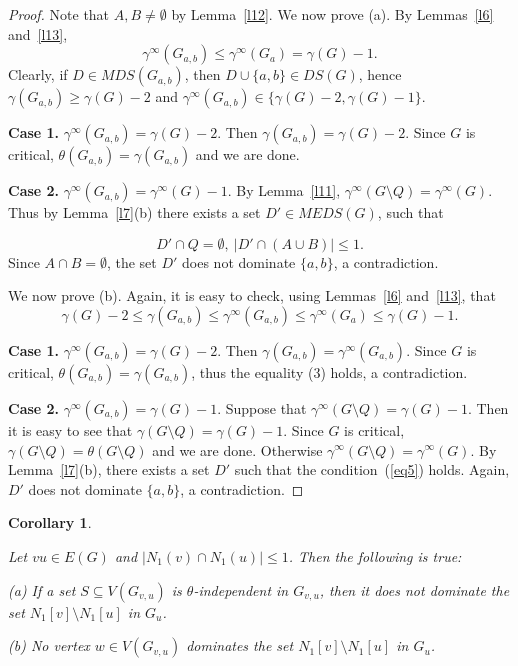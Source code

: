 \documentclass[12pt]{article}
\newtheorem{corollary}{Corollary}
\begin{document}
\begin{proof}
Note that $A,B \neq \emptyset$ by Lemma~\ref{l12}. We now prove (a). By Lemmas~\ref{l6} and~\ref{l13}, $$\gamma^{\infty}(G_{a,b}) \leq \gamma^{\infty}(G_a) = \gamma(G) - 1.$$ 
Clearly, if $D \in MDS(G_{a,b})$, then $D \cup \{a,b\} \in DS(G)$, hence $\gamma(G_{a,b}) \geq \gamma(G) - 2$ and $\gamma^{\infty}(G_{a,b}) \in \{\gamma(G) - 2, \gamma(G) - 1\}$. 

\textbf{Case 1.} $\gamma^{\infty}(G_{a,b}) = \gamma(G) - 2$. Then $\gamma(G_{a,b}) = \gamma(G) - 2$. Since $G$ is critical, $\theta(G_{a,b}) = \gamma(G_{a,b})$ and we are done. 

\textbf{Case 2.} $\gamma^{\infty}(G_{a,b}) = \gamma^{\infty}(G) - 1$. By Lemma~\ref{l11}, $\gamma^{\infty}(G \setminus Q) = \gamma^{\infty}(G)$. Thus by Lemma~\ref{l7}(b) there exists a set $D' \in MEDS(G)$, such that 

\begin{equation}\label{eq5}
D' \cap Q = \emptyset, \ |D' \cap (A \cup B)| \leq 1.
\end{equation}
Since $A \cap B = \emptyset$, the set $D'$ does not dominate $\{a,b\}$, a contradiction.

We now prove (b). Again, it is easy to check, using Lemmas~\ref{l6} and~\ref{l13}, that $$\gamma(G) - 2 \leq \gamma(G_{a,b}) \leq \gamma^{\infty}(G_{a,b}) \leq \gamma^{\infty}(G_a) \leq \gamma(G) - 1.$$

\textbf{Case 1.} $\gamma^{\infty}(G_{a,b}) = \gamma(G) - 2$. Then $\gamma(G_{a,b}) = \gamma^{\infty}(G_{a,b})$. Since $G$ is critical, $\theta(G_{a,b}) = \gamma(G_{a,b})$, thus the equality (3) holds, a contradiction. 

\textbf{Case 2.} $\gamma^{\infty}(G_{a,b}) = \gamma(G) - 1$. Suppose that $\gamma^{\infty}(G \setminus Q) = \gamma(G) - 1$. Then it is easy to see that $\gamma(G \setminus Q) = \gamma(G) - 1$. Since $G$ is critical, $\gamma(G \setminus Q) = \theta(G \setminus Q)$ and we are done. Otherwise $\gamma^{\infty}(G \setminus Q) = \gamma^{\infty}(G)$. By Lemma~\ref{l7}(b), there exists a set $D'$ such that the condition~(\ref{eq5}) holds. Again, $D'$ does not dominate $\{a,b\}$, a contradiction.\end{proof}

\begin{corollary}\label{cor1}

Let $vu \in E(G)$ and $|N_1(v) \cap N_1(u)| \leq 1$. Then the following is true: 

(a) If a set $S \subseteq V(G_{v,u})$ is $\theta$-independent in $G_{v,u}$, then it does not dominate the set $N_1[v] \setminus N_1[u]$ in $G_u$.

(b) No vertex $w \in V(G_{v,u})$ dominates the set $N_1[v] \setminus N_1[u]$ in $G_u$.

\end{corollary}
\end{document}
